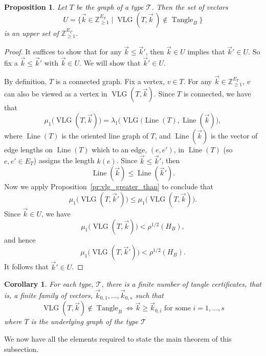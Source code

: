 \documentclass{memo-l}
\theoremstyle{plain}
\theoremstyle{definition}
\numberwithin{section}{chapter}
\numberwithin{equation}{chapter}
\newcommand{\rhoroot}[1]{\rho^{1/2}(H_{#1})}
\DeclareMathOperator{\VLG}{VLG}
\DeclareMathOperator{\Tangle}{Tangle}
\DeclareMathOperator{\Line}{Line}
\theoremstyle{plain}
\newtheorem{prop}[theorem]{Proposition}
\newtheorem{cor}[theorem]{Corollary}
\theoremstyle{definition}
\newcommand\ZZ{\mathbb{Z}}
\newcommand\cT{\mathcal{T}}
\begin{document}
\begin{prop}\label{prop:tangle_upset} Let \( T \) be the graph of a type \(
\cT \). Then the set of vectors \[ 
U = \{ \vec k \in \ZZ_{\geq 1}^{E_T} \mid
\VLG(T, \vec k\,) \notin \Tangle_B \} \] is an upper set of \( \ZZ_{\geq
1}^{E_T} \). 
\end{prop}
\begin{proof}
It suffices to show that for any $\vec k\le\vec k'$, then
$\vec k\in U$ implies that $\vec k'\in U$.  So fix
a $\vec k\le \vec k'$ with $\vec k\in U$.
We will show that $\vec k'\in U$.

By definition, $T$ is a connected graph.  
Fix a vertex, $v\in T$.
For any $\vec k\in\ZZ_{\ge 1}^{E_T}$, $v$ can also be viewed as 
a vertex in $\VLG(T,\vec k)$.  Since $T$ is connected, we have that
$$
\mu_1\bigl( \VLG(T,\vec k) \bigr) =
\lambda_1\bigl( \VLG(\Line(T),\Line(\vec k) \bigr),
$$
where $\Line(T)$ is the oriented line graph of $T$, and
$\Line(\vec k)$ is the vector of edge lengths on $\Line(T)$
which to an edge, $(e,e')$, in $\Line(T)$ (so $e,e'\in E_T$)
assigns the length $k(e)$.
Since $\vec k\le\vec k'$, then 
$$
\Line(\vec k) \le \Line(\vec k').
$$
Now we apply Proposition~\ref{pr:vlg_greater_than} to conclude that
$$
\mu_1\bigl( \VLG(T,\vec k') \bigr) 
\le 
\mu_1\bigl( \VLG(T,\vec k) \bigr)  .
$$
Since $\vec k\in U$, we have
$$
\mu_1\bigl( \VLG(T,\vec k) \bigr)  < \rhoroot{B},
$$
and hence
$$
\mu_1\bigl( \VLG(T,\vec k') \bigr)  < \rhoroot{B}.
$$
It follows that $\vec k'\in U$.
\end{proof} 

\begin{cor} For each type, \( \cT \), there is a
finite number of \emph{tangle certificates}, that is, a finite family of
vectors, \( \vec k_{0,1}, \ldots, \vec k_{0,s} \) such that \[ \VLG(T, \vec
k) \notin \Tangle_B \iff \vec k \geq \vec k_{0,i} \text{ for some }
i=1,\ldots,s \] where \( T \) is the underlying graph of the type \( \cT \)
\end{cor}

We now have all the elements required to state the main theorem of this
subsection.
\end{document}
